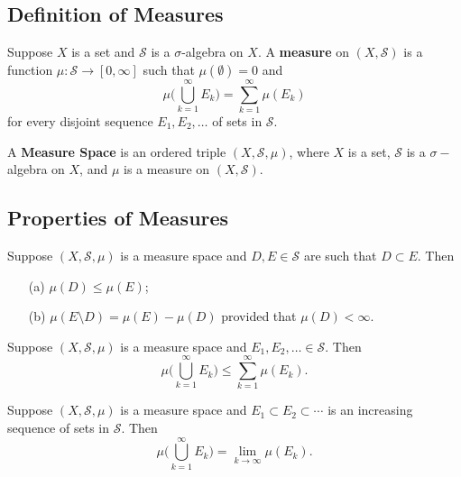 \subsection{Definition of Measures}

\begin{definition}[Measure]
    Suppose \( X  \) is a set and \( \mathcal{S} \) is a \( \sigma \)-algebra on \( X  \). A \textbf{measure} on \( (X,\mathcal{S}) \) is a function \( \mu : \mathcal{S} \to [0,\infty ] \) such that \( \mu(\emptyset) = 0  \) and  
    \[  \mu \Big(  \bigcup_{ k = 1  }^{ \infty  }  {E}_{k} \Big) = \sum_{ k=1  }^{ \infty  } \mu({E}_{k}) \]
    for every disjoint sequence \( {E}_{1}, {E}_{2}, \dots  \) of sets in \( \mathcal{S} \).
\end{definition}

\begin{definition}
    A \textbf{Measure Space} is an ordered triple \( (X, \mathcal{S}, \mu) \), where \( X  \) is a set, \( \mathcal{S} \) is a \( \sigma- \)algebra on \( X  \), and \( \mu  \) is a measure on \( (X,\mathcal{S}) \).
\end{definition}

\subsection{Properties of Measures}

\begin{prop}
    Suppose \( (X,\mathcal{S}, \mu)  \) is a measure space and \( D,E \in \mathcal{S} \) are such that \( D \subset E  \). Then
    \begin{enumerate}
        \item[(a)] \( \mu(D) \leq \mu(E) \);
        \item[(b)] \( \mu(E \setminus  D ) = \mu(E) - \mu(D) \) provided that \( \mu(D) < \infty  \).
    \end{enumerate}
\end{prop}

\begin{prop}
    Suppose \( (X,\mathcal{S}, \mu) \) is a measure space and \( {E}_{1}, {E}_{2}, \dots \in \mathcal{S}  \). Then
    \[  \mu \Big(  \bigcup_{ k=1  }^{ \infty  }  {E}_{k} \Big) \leq \sum_{ k=1  }^{ \infty  } \mu({E}_{k}). \]
\end{prop}

\begin{prop}
    Suppose \( (X,\mathcal{S}, \mu) \) is a measure space and \( {E}_{1} \subset {E}_{2} \subset \cdots \) is an increasing sequence of sets in \( \mathcal{S} \). Then 
    \[  \mu \Big(  \bigcup_{ k=1  }^{ \infty  }  {E}_{k} \Big) = \lim_{ k  \to  \infty  }  \mu({E}_{k}). \]
\end{prop}

